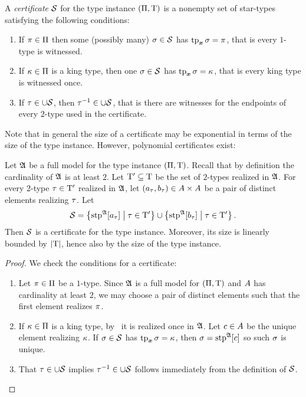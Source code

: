 \begin{definition}
A \emph{certificate} $\mathcal{S}$ for the type instance $(\Pi,\mathrm{T})$ is a
nonempty set of star-types satisfying the following conditions:
\begin{enumerate}
  \item\label{cond:cert-1} If $\pi \in \Pi$ then some (possibly many) $\sigma
  \in \mathcal{S}$ has $\operatorname{tp}_{\bm{x}}\sigma = \pi$, that is every $1$-type is witnessed.
  \item\label{cond:cert-2} If $\kappa \in \Pi$ is a king type, then one $\sigma
  \in \mathcal{S}$ has $\operatorname{tp}_{\bm{x}}\sigma = \kappa$, that is every king type is witnessed once.
  \item\label{cond:cert-3} If $\tau \in \cup\mathcal{S}$, then $\tau^{-1} \in
  \cup\mathcal{S}$, that is there are witnesses for the endpoints of every $2$-type used in the certificate.
\end{enumerate}
\end{definition}
Note that in general the size of a certificate may be exponential in terms of
the size of the type instance. However, polynomial certificates exist:
\begin{lemma}\label{lem:cert-extract}
Let $\mathfrak{A}$ be a full model for the type instance $(\Pi,\mathrm{T})$. Recall that
by definition the cardinality of $\mathfrak{A}$ is at least $2$.
Let ${\mathrm{T}'} \subseteq \mathrm{T}$ be the set of $2$-types realized in $\mathfrak{A}$.
For every $2$-type $\tau \in {\mathrm{T}'}$ realized in $\mathfrak{A}$, let $(a_\tau,
b_\tau) \in A\times A$ be a pair of distinct elements realizing
$\tau$.
Let 
\[
  \mathcal{S} = \left\{\operatorname{stp}^{\mathfrak{A}}[a_\tau]\mathrel{}\middle|\mathrel{}\tau\in{\mathrm{T}'}\right\} \cup
  \left\{\operatorname{stp}^{\mathfrak{A}}[b_\tau]\mathrel{}\middle|\mathrel{}\tau\in{\mathrm{T}'}\right\}.
\]
Then $\mathcal{S}$ is a certificate for the type instance. Moreover, its size is
linearly bounded by $\left|\mathrm{T}\right|$, hence also by the size of the type instance.
\end{lemma}
\begin{proof}
We check the conditions for a certificate:
\begin{enumerate}
  \item Let $\pi \in \Pi$ be a $1$-type. Since $\mathfrak{A}$ is a full
  model for $(\Pi,\mathrm{T})$ and $A$ has cardinality at least $2$, we may
  choose a pair of distinct elements such that the first element realizes
  $\pi$.
  \item If $\kappa \in \Pi$ is a king type, by~ it
  is realized once in $\mathfrak{A}$.
  Let $c \in A$ be the unique element realizing $\kappa$.
  If $\sigma \in \mathcal{S}$ has $\operatorname{tp}_{\bm{x}}\sigma = \kappa$, then $\sigma = \operatorname{stp}^{\mathfrak{A}}[c]$
  so such $\sigma$ is unique.
  \item That $\tau \in \cup\mathcal{S}$ implies $\tau^{-1} \in \cup\mathcal{S}$ follows
  immediately from the definition of $\mathcal{S}$.
\end{enumerate}
\end{proof}

